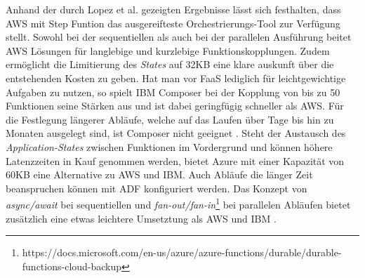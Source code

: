 Anhand der durch Lopez et al. gezeigten Ergebnisse lässt sich festhalten, dass AWS mit Step Funtion das ausgereifteste Orchestrierungs-Tool zur Verfügung stellt. Sowohl bei der sequentiellen als auch bei der parallelen Ausführung beitet AWS Lösungen für langlebige und kurzlebige Funktionskopplungen. Zudem ermöglicht die Limitierung des \textit{States} auf 32KB eine klare auskunft über die entstehenden Kosten zu geben. Hat man vor FaaS lediglich für leichtgewichtige Aufgaben zu nutzen, so spielt IBM Composer bei der Kopplung von bis zu 50 Funktionen seine Stärken aus und ist dabei geringfügig schneller als AWS. Für die Festlegung längerer Abläufe, welche auf das Laufen über Tage bis hin zu Monaten ausgelegt sind, ist Composer nicht geeignet \cite{lopez2018comparison}. Steht der Austausch des \textit{Application-States} zwischen Funktionen im Vordergrund und können höhere Latenzzeiten in Kauf genommen werden, bietet Azure mit einer Kapazität von 60KB eine Alternative zu AWS und IBM. Auch Abläufe die länger Zeit beanspruchen können mit ADF konfiguriert werden. Das Konzept von \textit{async/await} bei sequentiellen und \textit{fan-out/fan-in}\footnote{https://docs.microsoft.com/en-us/azure/azure-functions/durable/durable-functions-cloud-backup} bei parallelen Abläufen bietet zusätzlich eine etwas leichtere Umsetztung als AWS und IBM \cite{lopez2018comparison}.


